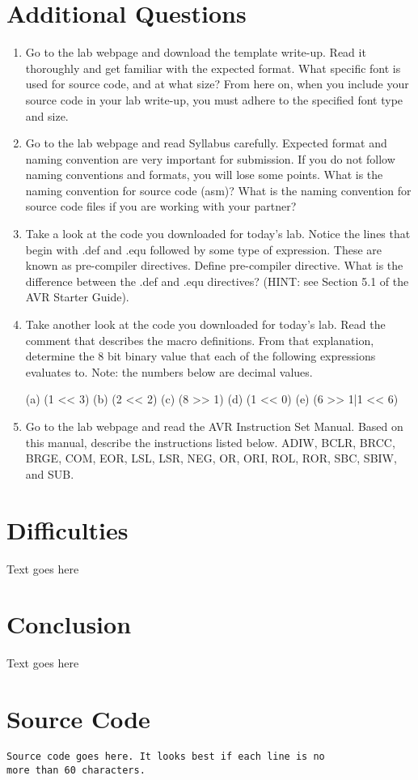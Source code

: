 \documentclass[12pt,letterpaper]{article}
\begin{document}
\section{Additional Questions}
\begin{enumerate}

    \item Go to the lab webpage and download the template write-up. Read it thoroughly and get familiar with the expected format. What specific font is used for source code, and at what size? From here on, when you include your source code in your lab write-up, you must adhere to the specified font type and size.

	\item Go to the lab webpage and read Syllabus carefully. Expected format and
naming convention are very important for submission. If you do not follow naming conventions and formats, you will lose some points. What is the naming convention for source code (asm)? What is the naming convention for source code files if you are working with your partner?
	
	\item Take a look at the code you downloaded for today’s lab. Notice the lines that begin with .def and .equ followed by some type of expression. These are known as pre-compiler directives. Define pre-compiler directive. What is the difference between the .def and .equ directives? (HINT: see Section 5.1 of the AVR Starter Guide).
	
	\item Take another look at the code you downloaded for today’s lab. Read the comment that describes the macro definitions. From that explanation, determine the 8 bit binary value that each of the following expressions evaluates to. Note: the numbers below are decimal values.
	
(a) (1 << 3)
(b) (2 << 2)
(c) (8 >> 1)
(d) (1 << 0)
(e) (6 >> 1|1 << 6)
	
	\item Go to the lab webpage and read the AVR Instruction Set Manual. Based
on this manual, describe the instructions listed below. ADIW, BCLR, BRCC, BRGE, COM, EOR, LSL, LSR, NEG, OR, ORI, ROL, ROR, SBC, SBIW, and SUB.

\end{enumerate}

\section{Difficulties}
Text goes here

\section{Conclusion}
Text goes here

\section{Source Code}
\begin{verbatim}
Source code goes here. It looks best if each line is no
more than 60 characters.
\end{verbatim}
\end{document}
